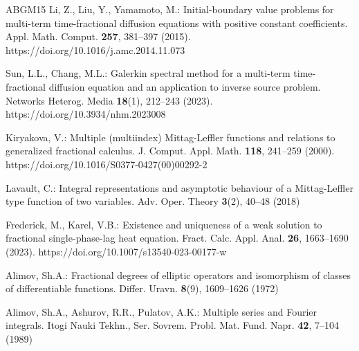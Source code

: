 \documentclass[12pt, reqno]{amsart}
\theoremstyle{definition}
\theoremstyle{remark}
\numberwithin{equation}{section}
\begin{document}
\begin{thebibliography}{ABGM15}
 Li, Z., Liu, Y., Yamamoto, M.: Initial-boundary value problems for multi-term time-fractional diffusion equations with positive constant coefficients. Appl. Math. Comput. \textbf{257}, 381–397 (2015). https://doi.org/10.1016/j.amc.2014.11.073

 Sun, L.L., Chang, M.L.: Galerkin spectral method for a multi-term time-fractional diffusion equation and an application to inverse source problem. Networks Heterog. Media \textbf{18}(1), 212–243 (2023). https://doi.org/10.3934/nhm.2023008

 Kiryakova, V.: Multiple (multiindex) Mittag-Leffler functions and relations to generalized fractional calculus. J. Comput. Appl. Math. \textbf{118}, 241–259 (2000). https://doi.org/10.1016/S0377-0427(00)00292-2

 Lavault, C.: Integral representations and asymptotic behaviour of a Mittag-Leffler type function of two variables. Adv. Oper. Theory \textbf{3}(2), 40–48 (2018)

 Frederick, M., Karel, V.B.: Existence and uniqueness of a weak solution to fractional single-phase-lag heat equation. Fract. Calc. Appl. Anal. \textbf{26}, 1663–1690 (2023). https://doi.org/10.1007/s13540-023-00177-w

 Alimov, Sh.A.: Fractional degrees of elliptic operators and isomorphism of classes of differentiable functions. Differ. Uravn. \textbf{8}(9), 1609–1626 (1972)

 Alimov, Sh.A., Ashurov, R.R., Pulatov, A.K.: Multiple series and Fourier integrals. Itogi Nauki Tekhn., Ser. Sovrem. Probl. Mat. Fund. Napr. \textbf{42}, 7–104 (1989)


\end{thebibliography}
\end{document}
